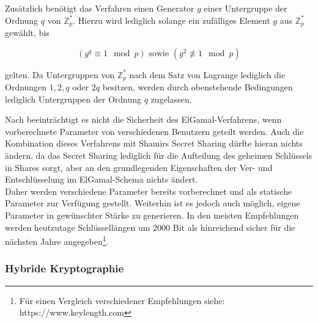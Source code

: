 Zusätzlich benötigt das Verfahren einen Generator \(g\) einer Untergruppe der Ordnung \(q\) von \(\mathbb{Z}_p^*\). Hierzu wird lediglich solange ein zufälliges Element \(g\) aus \(\mathbb{Z}_p^*\) gewählt, bis 

\[(g^q \equiv 1 \mod p) \text{ sowie } (g^2 \not\equiv 1 \mod p)\] 

gelten. Da Untergruppen von \(\mathbb{Z}_p^*\) nach dem Satz von Lagrange lediglich die Ordnungen \(1, 2, q\) oder \(2q\) besitzen, werden durch obenstehende Bedingungen lediglich Untergruppen der Ordnung \(q\) zugelassen.

Nach \cite{katz2014} beeinträchtigt es nicht die Sicherheit des ElGamal-Verfahrens, wenn vorberechnete Parameter von verschiedenen Benutzern geteilt werden. Auch die Kombination dieses Verfahrens mit Shamirs Secret Sharing dürfte hieran nichts ändern, da das Secret Sharing lediglich für die Aufteilung des geheimen Schlüssels in Shares sorgt, aber an den grundlegenden Eigenschaften der Ver- und Entschlüsselung im ElGamal-Schema nichts ändert.\\
Daher werden verschiedene Parameter bereits vorberechnet und als statische Parameter zur Verfügung gestellt. Weiterhin ist es jedoch auch möglich, eigene Parameter in gewünschter Stärke zu generieren. In den meisten Empfehlungen werden heutzutage Schlüssellängen um 2000 Bit als hinreichend sicher für die nächsten Jahre angegeben\footnote{
  Für einen Vergleich verschiedener Empfehlungen siehe: https://www.keylength.com
}.

\subsubsection{Hybride Kryptographie}

\label{sec_impl_threshold_hybrid}
  
%  
%  

